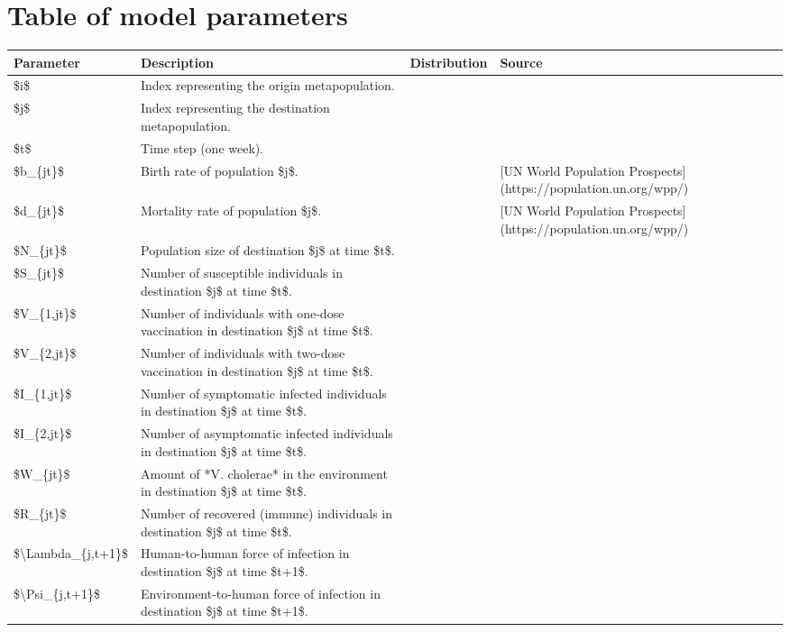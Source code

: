 \documentclass[
]{book}
\begin{document}
\label{parameters-table}

\section{Table of model parameters}\label{table-of-model-parameters}

\begin{tabular}{l|l|l|l}
\hline
Parameter & Description & Distribution & Source\\
\hline
\$i\$ & Index representing the origin metapopulation. &  & \\
\hline
\$j\$ & Index representing the destination metapopulation. &  & \\
\hline
\$t\$ & Time step (one week). &  & \\
\hline
\$b\_\{jt\}\$ & Birth rate of population \$j\$. &  & [UN World Population Prospects](https://population.un.org/wpp/)\\
\hline
\$d\_\{jt\}\$ & Mortality rate of population \$j\$. &  & [UN World Population Prospects](https://population.un.org/wpp/)\\
\hline
\$N\_\{jt\}\$ & Population size of destination \$j\$ at time \$t\$. &  & \\
\hline
\$S\_\{jt\}\$ & Number of susceptible individuals in destination \$j\$ at time \$t\$. &  & \\
\hline
\$V\_\{1,jt\}\$ & Number of individuals with one-dose vaccination in destination \$j\$ at time \$t\$. &  & \\
\hline
\$V\_\{2,jt\}\$ & Number of individuals with two-dose vaccination in destination \$j\$ at time \$t\$. &  & \\
\hline
\$I\_\{1,jt\}\$ & Number of symptomatic infected individuals in destination \$j\$ at time \$t\$. &  & \\
\hline
\$I\_\{2,jt\}\$ & Number of asymptomatic infected individuals in destination \$j\$ at time \$t\$. &  & \\
\hline
\$W\_\{jt\}\$ & Amount of *V. cholerae* in the environment in destination \$j\$ at time \$t\$. &  & \\
\hline
\$R\_\{jt\}\$ & Number of recovered (immune) individuals in destination \$j\$ at time \$t\$. &  & \\
\hline
\$\textbackslash{}Lambda\_\{j,t+1\}\$ & Human-to-human force of infection in destination \$j\$ at time \$t+1\$. &  & \\
\hline
\$\textbackslash{}Psi\_\{j,t+1\}\$ & Environment-to-human force of infection in destination \$j\$ at time \$t+1\$. &  & \\

\end{tabular}
\end{document}
